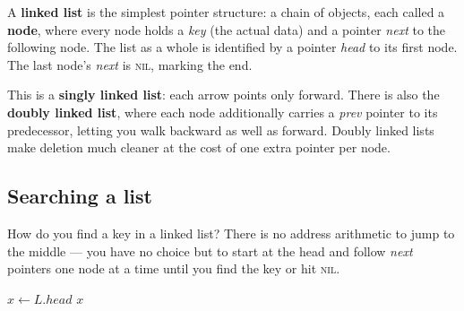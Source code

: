 A \textbf{linked list} is the simplest pointer structure: a chain of objects, each called a \textbf{node}, where every node holds a \emph{key} (the actual data) and a pointer \emph{next} to the following node. The list as a whole is identified by a pointer \emph{head} to its first node. The last node's \emph{next} is \textsc{nil}, marking the end.

\begin{center}
\end{center}

This is a \textbf{singly linked list}: each arrow points only forward. There is also the \textbf{doubly linked list}, where each node additionally carries a \emph{prev} pointer to its predecessor, letting you walk backward as well as forward. Doubly linked lists make deletion much cleaner at the cost of one extra pointer per node.

\subsection{Searching a list}

How do you find a key in a linked list? There is no address arithmetic to jump to the middle --- you have no choice but to start at the head and follow \emph{next} pointers one node at a time until you find the key or hit \textsc{nil}.

\begin{algorithm}[H]
\caption{\textsc{List-Search}$(L, k)$ --- find the first node with key $k$}
\DontPrintSemicolon
{}
$x \gets L.head$\;
\Return $x$\;
\end{algorithm}

